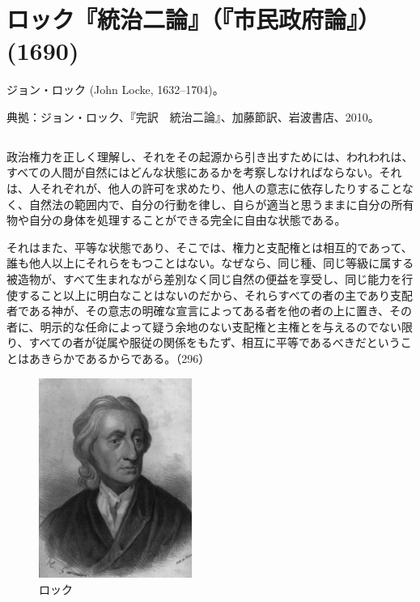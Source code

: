 \newpage{}






\section{ロック『統治二論』（『市民政府論』）(1690)}




ジョン・ロック (John Locke, 1632--1704)。


典拠：ジョン・ロック、『完訳　統治二論』、加藤節訳、岩波書店、2010。


\subsection{}


政治権力を正しく理解し、それをその起源から引き出すためには、われわれは、すべての人間が自然にはどんな状態にあるかを考察しなければならない。それは、人それぞれが、他人の許可を求めたり、他人の意志に依存したりすることなく、自然法の範囲内で、自分の行動を律し、自らが適当と思うままに自分の所有物や自分の身体を処理することができる完全に自由な状態である。

それはまた、平等な状態であり、そこでは、権力と支配権とは相互的であって、誰も他人以上にそれらをもつことはない。なぜなら、同じ種、同じ等級に属する被造物が、すべて生まれながら差別なく同じ自然の便益を享受し、同じ能力を行使すること以上に明白なことはないのだから、それらすべての者の主であり支配者である神が、その意志の明確な宣言によってある者を他の者の上に置き、その者に、明示的な任命によって疑う余地のない支配権と主権とを与えるのでない限り、すべての者が従属や服従の関係をもたず、相互に平等であるべきだということはあきらかであるからである。（296）





\begin{figure}[htbp]
  \centering
     \includegraphics[width=50mm]{images/Locke-John-LOC.jpg}
     \caption{ロック} 

\end{figure}


